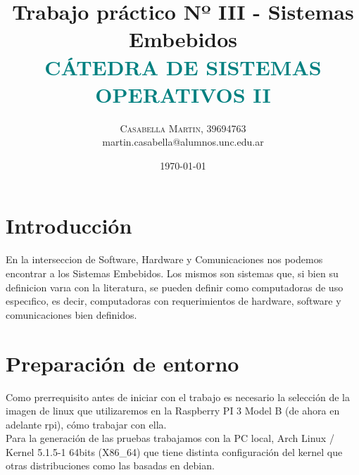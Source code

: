 \documentclass{article}
\title{\bigskip \bigskip \bigskip \bigskip \vspace{-15mm}\fontsize{35pt}{35pt}\selectfont\textbf{{Trabajo práctico Nº III - Sistemas Embebidos \\}}
\bigskip \bigskip \fontsize{18pt}{10pt}\selectfont\textbf{\textcolor{teal}{CÁTEDRA DE SISTEMAS OPERATIVOS II}}\bigskip\bigskip \bigskip\bigskip \bigskip}\bigskip\bigskip \bigskip\bigskip \bigskip %
\author{
\large
{
\textsc{Casabella Martin, 39694763 }}\\[2mm]
  martin.casabella@alumnos.unc.edu.ar\\[2mm]
\bigskip\bigskip \bigskip \bigskip\bigskip \bigskip
}
\date{\Huge\today}
\begin{document}
\maketitle
\clearpage


\renewcommand{\figurename}{\textbf{\textcolor{Orange}{Figura}}}
\renewcommand\thefigure{\textbf{\textcolor{Orange}{\arabic{figure}}}}

\tableofcontents

\clearpage


\section{Introducción}
En la interseccion de Software, Hardware y Comunicaciones nos podemos encontrar a los Sistemas Embebidos. Los mismos son sistemas que, si bien su
definicion varıa con la literatura, se pueden definir como computadoras de uso especıfico, es decir, computadoras con requerimientos de hardware, software y
comunicaciones bien definidos. 
\section{Preparación de entorno}
Como prerrequisito antes de iniciar con el trabajo es necesario la selección de la imagen de linux que utilizaremos en la Raspberry PI 3 Model B (de ahora en adelante rpi),
cómo trabajar con ella. \\

Para la generación de las pruebas trabajamos con la PC local, Arch Linux / Kernel 5.1.5-1 64bits (X86\_64) que tiene distinta configuración del kernel que otras distribuciones
como las basadas en debian.\\
\end{document}
